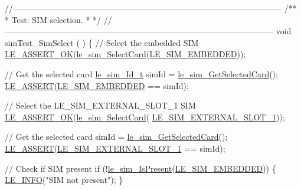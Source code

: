 \begin{DoxyCodeInclude}
\textcolor{comment}{//--------------------------------------------------------------------------------------------------}\textcolor{comment}{}
\textcolor{comment}{/**}
\textcolor{comment}{ * Test: SIM selection.}
\textcolor{comment}{ *}
\textcolor{comment}{ */}
\textcolor{comment}{//--------------------------------------------------------------------------------------------------}
\textcolor{keywordtype}{void} simTest\_SimSelect
(
)
\{
    \textcolor{comment}{// Select the embedded SIM}
    \hyperlink{le__log_8h_a7cd2daa3d4af1de4d29e0eed95187484}{LE\_ASSERT\_OK}(\hyperlink{le__sim__interface_8h_a91a0f0399c89e466b9a8ccfab6de129d}{le\_sim\_SelectCard}(\hyperlink{le__sim__interface_8h_aace49df88426119626fb1ef4e544ccddac9d9805213bfb9ae4d299aa70097846a}{LE\_SIM\_EMBEDDED}));

    \textcolor{comment}{// Get the selected card}
    \hyperlink{le__sim__interface_8h_aace49df88426119626fb1ef4e544ccdd}{le\_sim\_Id\_t} simId = \hyperlink{le__sim__interface_8h_a4c9e3ded0485f14c66e4d51763f2de57}{le\_sim\_GetSelectedCard}();
    \hyperlink{le__log_8h_ac0dbbef91dc0fed449d0092ff0557b39}{LE\_ASSERT}(\hyperlink{le__sim__interface_8h_aace49df88426119626fb1ef4e544ccddac9d9805213bfb9ae4d299aa70097846a}{LE\_SIM\_EMBEDDED} == simId);

    \textcolor{comment}{// Select the LE\_SIM\_EXTERNAL\_SLOT\_1 SIM}
    \hyperlink{le__log_8h_a7cd2daa3d4af1de4d29e0eed95187484}{LE\_ASSERT\_OK}(\hyperlink{le__sim__interface_8h_a91a0f0399c89e466b9a8ccfab6de129d}{le\_sim\_SelectCard}(
      \hyperlink{le__sim__interface_8h_aace49df88426119626fb1ef4e544ccdda4270fb44e8fa7876f337864675b42f2d}{LE\_SIM\_EXTERNAL\_SLOT\_1}));

    \textcolor{comment}{// Get the selected card}
    simId = \hyperlink{le__sim__interface_8h_a4c9e3ded0485f14c66e4d51763f2de57}{le\_sim\_GetSelectedCard}();
    \hyperlink{le__log_8h_ac0dbbef91dc0fed449d0092ff0557b39}{LE\_ASSERT}(\hyperlink{le__sim__interface_8h_aace49df88426119626fb1ef4e544ccdda4270fb44e8fa7876f337864675b42f2d}{LE\_SIM\_EXTERNAL\_SLOT\_1} == simId);

    \textcolor{comment}{// Check if SIM present}
    \textcolor{keywordflow}{if} (!\hyperlink{le__sim__interface_8h_aa3255a29cec4358c5e0d68b9ac62ff88}{le\_sim\_IsPresent}(\hyperlink{le__sim__interface_8h_aace49df88426119626fb1ef4e544ccddac9d9805213bfb9ae4d299aa70097846a}{LE\_SIM\_EMBEDDED}))
    \{
        \hyperlink{le__log_8h_a23e6d206faa64f612045d688cdde5808}{LE\_INFO}(\textcolor{stringliteral}{"SIM not present"});
    \}


\end{DoxyCodeInclude}
